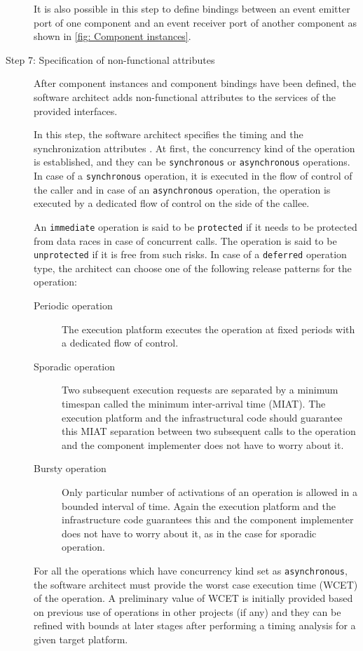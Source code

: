 \begin{description}
It is also possible in this step to define bindings between an event emitter port of one component and an event receiver port of another component as shown in \cref{fig: Component instances}.

\item [Step 7: Specification of non-functional attributes] After component instances and component bindings have been defined, the software architect adds non-functional attributes to the services of the provided interfaces. 

In this step, the software architect specifies the timing and the synchronization attributes \cite{CompBasedProcess}. At first, the concurrency kind of the operation is established, and they can be \texttt{synchronous} or \texttt{asynchronous} operations. In case of a \texttt{synchronous} operation, it is executed in the flow of control of the caller and in case of an \texttt{asynchronous} operation, the operation is executed by a dedicated flow of control on the side of the callee. 

An \texttt{immediate} operation is said to be \texttt{protected} if it needs to be protected from data races in case of concurrent calls. The operation is said to be \texttt{unprotected} if it is free from such risks. In case of a \texttt{deferred} operation type, the architect can choose one of the following release patterns for the operation:

\begin{description}
\item [Periodic operation] The execution platform executes the operation at fixed periods with a dedicated flow of control.
\item [Sporadic operation] Two subsequent execution requests are separated by a minimum timespan called the minimum inter-arrival time (MIAT). The execution platform and the infrastructural code should guarantee this MIAT separation between two subsequent calls to the operation and the component implementer does not have to worry about it.
\item [Bursty operation] Only particular number of activations of an operation is allowed in a bounded interval of time. Again the execution platform and the infrastructure code guarantees this and the component implementer does not have to worry about it, as in the case for sporadic operation.
\end{description} 

For all the operations which have concurrency kind set as \texttt{asynchronous}, the software architect must provide the worst case execution time (WCET) of the operation. A preliminary value of WCET is initially provided based on previous use of operations in other projects (if any) and they can be refined with bounds at later stages after performing a timing analysis for a given target platform.


\end{description}

